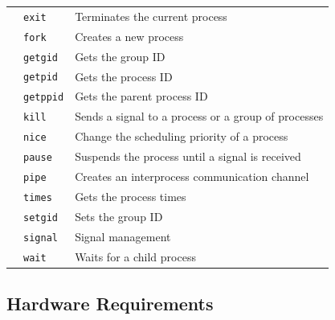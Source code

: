 \documentclass[10pt,a4paper]{article}
\begin{document}
\begin{table}[b]
\begin{tabular}{l l l}
	                                     & \texttt{exit}     & Terminates the current process                      \\
	                                     & \texttt{fork}     & Creates a new process                               \\
	                                     & \texttt{getgid}   & Gets the group ID                                   \\
	                                     & \texttt{getpid}   & Gets the process ID                                 \\
	                                     & \texttt{getppid}  & Gets the parent process ID                          \\
	                                     & \texttt{kill}     & Sends a signal to a process or a group of processes \\
	                                     & \texttt{nice}     & Change the scheduling priority of a process         \\
	                                     & \texttt{pause}    & Suspends the process until a signal is received     \\
	                                     & \texttt{pipe}     & Creates an interprocess communication channel       \\
	                                     & \texttt{times}    & Gets the process times                              \\
	                                     & \texttt{setgid}   & Sets the group ID                                   \\
	                                     & \texttt{signal}   & Signal management                                   \\
	                                     & \texttt{wait}     & Waits for a child process                           \\
	\bottomrule
\end{tabular}
\end{table}


\subsection{Hardware Requirements}
\label{section: hardware requirements}
\end{document}
